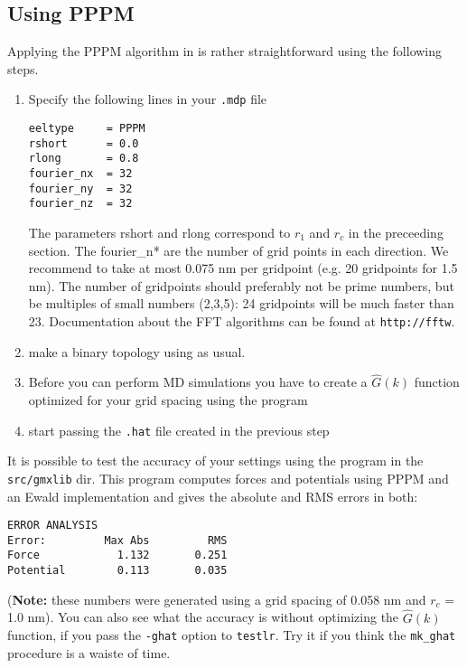 \subsection{Using PPPM}
Applying the PPPM algorithm in {\gromacs} is rather straightforward using the
following steps.
\begin{enumerate}
\item	Specify the following lines in your {\tt .mdp} file
\begin{verbatim}
eeltype		= PPPM
rshort		= 0.0
rlong		= 0.8
fourier_nx	= 32
fourier_ny	= 32
fourier_nz	= 32
\end{verbatim}
The parameters rshort and rlong correspond to $r_1$ and $r_c$ in the preceeding
section. The fourier\_n* are the number of grid points in each direction.
We recommend to take at most 0.075 nm per gridpoint (e.g. 20 gridpoints for 1.5 nm).
The number of gridpoints should preferably not be prime numbers, but be multiples
of small numbers (2,3,5): 24 gridpoints will be much faster than 23. Documentation
about the FFT algorithms can be found at 
{\tt http://fftw}.

\item 	make a binary topology using {\tt{}} as usual. 
\item	Before you can perform MD simulations you have to create a 
	$\hat{G}(k)$ function optimized for your grid spacing using the
	{\tt{}} program
\item	start {\tt{}} passing the {\tt .hat} file created in the
	previous step
\end{enumerate}

It is possible to test the accuracy of your settings using the program 
{\tt{}} in the {\tt src/gmxlib} dir. This program computes
forces and potentials using PPPM and an Ewald implementation and gives the
absolute and RMS errors in both:
\begin{verbatim}
ERROR ANALYSIS
Error:         Max Abs         RMS            
Force            1.132       0.251
Potential        0.113       0.035
\end{verbatim}
({\bf Note:} these numbers were generated using a grid spacing of 0.058 nm and $r_c$
= 1.0 nm). 
You can also see what the accuracy is
without optimizing the $\hat{G}(k)$ function, if you pass the {\tt -ghat}
option to {\tt testlr}. Try it if you think the {\tt mk\_ghat} procedure is a waiste
of time.
